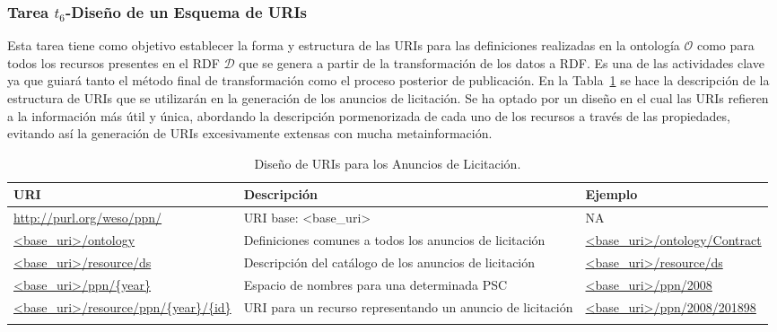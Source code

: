 \subsubsection{Tarea $t_6$-Diseño de un Esquema de URIs}
Esta tarea tiene como objetivo establecer la forma y estructura de las URIs para las definiciones 
realizadas en la ontología $\mathcal{O}$ como para todos los recursos presentes en el \dataset RDF $\mathcal{D}$ que 
se genera a partir de la transformación de los datos a \gls{RDF}. Es una de las actividades clave ya que guiará 
tanto el método final de transformación como el proceso posterior de publicación. En la Tabla~\ref{table:ppn-uris} se 
hace la descripción de la estructura de \gls{URI}s que se utilizarán en la generación de los anuncios de licitación. Se ha optado 
por un diseño en el cual las URIs refieren a la información más útil y única, abordando la descripción pormenorizada 
de cada uno de los recursos a través de las propiedades, evitando así la generación de URIs excesivamente extensas con 
mucha metainformación.
% 
\begin{longtable}[c]{|p{5cm}|p{4.5cm}|p{5cm}|} 
  \textbf{URI} &  \textbf{Descripción} & \textbf{Ejemplo} \\\hline
\endhead
\url{http://purl.org/weso/ppn/} & URI base: <base\_uri> & NA \\ \hline
\url{<base_uri>/ontology} & Definiciones comunes a todos los anuncios de licitación & \url{<base_uri>/ontology/Contract} \\ \hline
\url{<base_uri>/resource/ds} & Descripción del catálogo de los anuncios de licitación & \url{<base_uri>/resource/ds} \\ \hline
\url{<base_uri>/ppn/{year}} & Espacio de nombres para una determinada PSC & \url{<base_uri>/ppn/2008} \\ \hline
\url{<base_uri>/resource/ppn/{year}/{id}} & URI para un recurso representando un anuncio de licitación & \url{<base_uri>/ppn/2008/201898} \\ \hline
\hline
\caption{Diseño de URIs para los Anuncios de Licitación.}\label{table:ppn-uris}\\    
\end{longtable}

